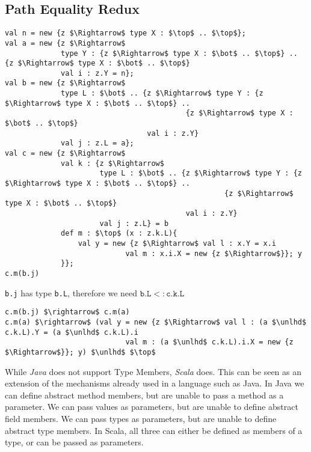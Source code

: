 \documentclass{llncs}
\begin{document}
\subsection{Path Equality Redux}
\begin{lstlisting}[mathescape, style=custom_lang]
val n = new {z $\Rightarrow$ type X : $\top$ .. $\top$};
val a = new {z $\Rightarrow$
             type Y : {z $\Rightarrow$ type X : $\bot$ .. $\top$} .. {z $\Rightarrow$ type X : $\bot$ .. $\top$}
             val i : z.Y = n};
val b = new {z $\Rightarrow$
             type L : $\bot$ .. {z $\Rightarrow$ type Y : {z $\Rightarrow$ type X : $\bot$ .. $\top$} .. 
                                          {z $\Rightarrow$ type X : $\bot$ .. $\top$}
                                 val i : z.Y}
             val j : z.L = a};
val c = new {z $\Rightarrow$
             val k : {z $\Rightarrow$
                      type L : $\bot$ .. {z $\Rightarrow$ type Y : {z $\Rightarrow$ type X : $\bot$ .. $\top$} .. 
                                                   {z $\Rightarrow$ type X : $\bot$ .. $\top$}
                                          val i : z.Y}
                      val j : z.L} = b
             def m : $\top$ (x : z.k.L){
                 val y = new {z $\Rightarrow$ val l : x.Y = x.i 
                            val m : x.i.X = new {z $\Rightarrow$}}; y
             }};
c.m(b.j)
\end{lstlisting}
\texttt{b.j} has type \texttt{b.L}, therefore we need 
$\texttt{b.L} <: \texttt{c.k.L}$
\begin{lstlisting}[mathescape, style=custom_lang]
c.m(b.j) $\rightarrow$ c.m(a)
c.m(a) $\rightarrow$ (val y = new {z $\Rightarrow$ val l : (a $\unlhd$ c.k.L).Y = (a $\unlhd$ c.k.L).i 
                            val m : (a $\unlhd$ c.k.L).i.X = new {z $\Rightarrow$}}; y) $\unlhd$ $\top$
\end{lstlisting}


\newpage


While \emph{Java} does not support Type Members, \emph{Scala} does.
This can be seen as an extension of the mechanisms already used in 
a language such as Java. In Java we can define abstract method members, but 
are unable to pass a method as a parameter. We can pass values as 
parameters, but are unable to define abstract field members. We can pass 
types as parameters, but are unable to define abstract type members.
In Scala, all three can either be defined as members of a type, or 
can be passed as parameters. 
\end{document}
